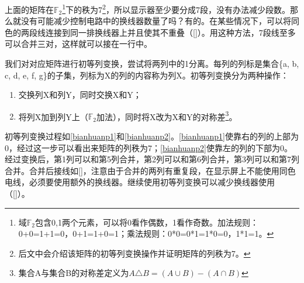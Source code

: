 上面的矩阵在$\mathbb{F}_2$\footnote{域$\mathbb{F}_2$包含0,1两个元素，可以将0看作偶数，1看作奇数。加法规则：0+0=1+1=0，0+1=1+0=1；乘法规则：0*0=0*1=1*0=0，1*1=1。}下的秩为7\footnote{后文中会介绍该矩阵的初等列变换操作并证明矩阵的列秩为7。}，所以显示器至少要分成7段，没有办法减少段数。那么就没有可能减少控制电路中的换线器数量了吗？有的。在某些情况下，可以将同色的两段线连接到同一排换线器上并且使其不重叠（\autoref{}）。用这种方法，7段线至多可以合并三对，这样就可以接在一行中。

我们对对应矩阵进行初等列变换，尝试将两列中的1分离。每列的列标是集合\{a, b, c, d, e, f, g\}的子集，列标为X的列的内容称为列X。初等列变换分为两种操作：
\begin{enumerate}
\item 交换列X和列Y，同时交换X和Y；
\item 将列X加到列Y上（$\mathbb{F}_2$加法），同时将X改为X和Y的对称差\footnote{集合A与集合B的对称差定义为$A\triangle B=(A\cup B)-(A\cap B)$}。
\end{enumerate}

初等列变换过程如\autoref{bianhuanp1}和\autoref{bianhuanp2}。\autoref{bianhuanp1}使靠右的列的上部为0，经过这一步可以看出来矩阵的列秩为7；\autoref{bianhuanp2}使靠左的列的下部为0。经过变换后，第1列可以和第5列合并，第2列可以和第6列合并，第3列可以和第7列合并。合并后接线如\autoref{}，注意由于合并的两列有重复段，在显示屏上不能使用同色电线，必须要使用额外的换线器。继续使用初等列变换可以减少换线器使用（\autoref{}）。


